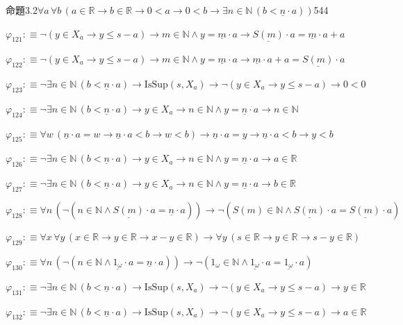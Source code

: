 \begin{fullproof}{命題3.2}{$\forall a\,\forall b\,(a \in \mathbb{R} \to b \in \mathbb{R} \to 0 < a \to 0 < b \to \exists n \in \mathbb{N}\,(b < \underline{n} \cdot a))$}{544}
\begin{abbrevlist}
\item $\varphi_{121} :\equiv \neg (y \in X_{a} \to y \leq s - a) \to m \in \mathbb{N} \land y = \underline{m} \cdot a \to \underline{S(m)} \cdot a = \underline{m} \cdot a + a$
\item $\varphi_{122} :\equiv \neg (y \in X_{a} \to y \leq s - a) \to m \in \mathbb{N} \land y = \underline{m} \cdot a \to \underline{m} \cdot a + a = \underline{S(m)} \cdot a$
\item $\varphi_{123} :\equiv \neg \exists n \in \mathbb{N}\,(b < \underline{n} \cdot a) \to \mathrm{IsSup}(s,X_{a}) \to \neg (y \in X_{a} \to y \leq s - a) \to 0 < 0$
\item $\varphi_{124} :\equiv \neg \exists n \in \mathbb{N}\,(b < \underline{n} \cdot a) \to y \in X_{a} \to n \in \mathbb{N} \land y = \underline{n} \cdot a \to n \in \mathbb{N}$
\item $\varphi_{125} :\equiv \forall w\,(\underline{n} \cdot a = w \to \underline{n} \cdot a < b \to w < b) \to \underline{n} \cdot a = y \to \underline{n} \cdot a < b \to y < b$
\item $\varphi_{126} :\equiv \neg \exists n \in \mathbb{N}\,(b < \underline{n} \cdot a) \to y \in X_{a} \to n \in \mathbb{N} \land y = \underline{n} \cdot a \to a \in \mathbb{R}$
\item $\varphi_{127} :\equiv \neg \exists n \in \mathbb{N}\,(b < \underline{n} \cdot a) \to y \in X_{a} \to n \in \mathbb{N} \land y = \underline{n} \cdot a \to b \in \mathbb{R}$
\item $\varphi_{128} :\equiv \forall n\,(\neg (n \in \mathbb{N} \land \underline{S(m)} \cdot a = \underline{n} \cdot a)) \to \neg (S(m) \in \mathbb{N} \land \underline{S(m)} \cdot a = \underline{S(m)} \cdot a)$
\item $\varphi_{129} :\equiv \forall x\,\forall y\,(x \in \mathbb{R} \to y \in \mathbb{R} \to x - y \in \mathbb{R}) \to \forall y\,(s \in \mathbb{R} \to y \in \mathbb{R} \to s - y \in \mathbb{R})$
\item $\varphi_{130} :\equiv \forall n\,(\neg (n \in \mathbb{N} \land \underline{1_{\omega}} \cdot a = \underline{n} \cdot a)) \to \neg (1_{\omega} \in \mathbb{N} \land \underline{1_{\omega}} \cdot a = \underline{1_{\omega}} \cdot a)$
\item $\varphi_{131} :\equiv \neg \exists n \in \mathbb{N}\,(b < \underline{n} \cdot a) \to \mathrm{IsSup}(s,X_{a}) \to \neg (y \in X_{a} \to y \leq s - a) \to y \in \mathbb{R}$
\item $\varphi_{132} :\equiv \neg \exists n \in \mathbb{N}\,(b < \underline{n} \cdot a) \to \mathrm{IsSup}(s,X_{a}) \to \neg (y \in X_{a} \to y \leq s - a) \to a \in \mathbb{R}$

\end{abbrevlist}
\end{fullproof}
